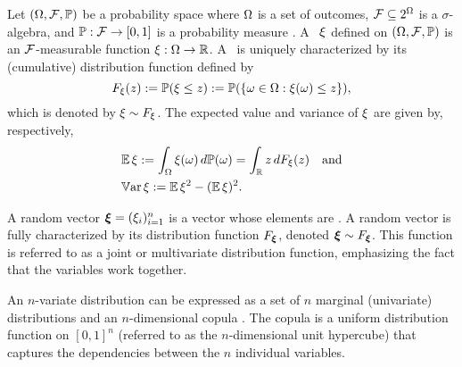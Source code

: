 Let $(\Omega, \mathcal{F}, \mathbb{P})$ be a probability space where $\Omega$ is a set of
outcomes, $\mathcal{F} \subseteq 2^\Omega$ is a $\sigma$-algebra, and
$\mathbb{P}: \mathcal{F} \to [0, 1]$ is a probability measure
\cite{durrett2010}. A \rv\ $\xi$ defined on $(\Omega, \mathcal{F}, \mathbb{P})$ is an
$\mathcal{F}$-measurable function $\xi: \Omega \to \mathbb{R}$. A \rv\ is
uniquely characterized by its (cumulative) distribution function defined by
\begin{equation*}
  F_\xi(z) := \mathbb{P}(\xi \leq z) := \mathbb{P}(\{ \omega \in \Omega: \xi(\omega) \leq z \}),
\end{equation*}
which is denoted by $\xi \sim F_\xi$. The expected value and variance
of $\xi$ are given by, respectively,
\begin{align}
  & \expectation{\h} := \int_\outcomes \h(\o) \, \d\probabilityMeasure(\o) = \int_\real z \, \d\distribution_\h(z) \hspace{1em} \text{and} \elab{expectation} \\
  & \variance{\h} := \expectation{\h^2} - (\expectation{\h})^2. \elab{variance}
\end{align}

A random vector $\bm{\xi} = (\xi_i)_{i = 1}^n$ is a vector whose elements are \rvs. A
random vector is fully characterized by its distribution function
$F_{\bm{\xi}}$, denoted $\bm{\xi} \sim F_{\bm{\xi}}$. This function is
referred to as a joint or multivariate distribution function, emphasizing the
fact that the variables work together.

An $n$-variate distribution can be expressed as a set of $n$ marginal
(univariate) distributions and an $n$-dimensional copula \cite{nelsen2006}. The
copula is a uniform distribution function on $[0, 1]^n$ (referred to as the
$n$-dimensional unit hypercube) that captures the dependencies between the $n$
individual variables.
